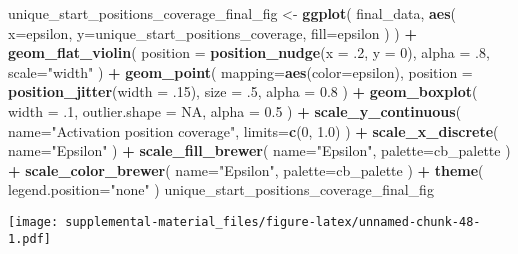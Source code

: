 \documentclass[]{book}
\newenvironment{Shaded}{\begin{snugshade}}{\end{snugshade}}
\newcommand{\DataTypeTok}[1]{\textcolor[rgb]{0.13,0.29,0.53}{#1}}
\newcommand{\DecValTok}[1]{\textcolor[rgb]{0.00,0.00,0.81}{#1}}
\newcommand{\FloatTok}[1]{\textcolor[rgb]{0.00,0.00,0.81}{#1}}
\newcommand{\KeywordTok}[1]{\textcolor[rgb]{0.13,0.29,0.53}{\textbf{#1}}}
\newcommand{\NormalTok}[1]{#1}
\newcommand{\OperatorTok}[1]{\textcolor[rgb]{0.81,0.36,0.00}{\textbf{#1}}}
\newcommand{\OtherTok}[1]{\textcolor[rgb]{0.56,0.35,0.01}{#1}}
\newcommand{\StringTok}[1]{\textcolor[rgb]{0.31,0.60,0.02}{#1}}
\begin{document}
\begin{Shaded}
\begin{Highlighting}[]
\NormalTok{unique_start_positions_coverage_final_fig <-}\StringTok{ }\KeywordTok{ggplot}\NormalTok{(}
\NormalTok{    final_data,}
    \KeywordTok{aes}\NormalTok{(}
      \DataTypeTok{x=}\NormalTok{epsilon,}
      \DataTypeTok{y=}\NormalTok{unique_start_positions_coverage,}
      \DataTypeTok{fill=}\NormalTok{epsilon}
\NormalTok{    )}
\NormalTok{  ) }\OperatorTok{+}
\StringTok{  }\KeywordTok{geom_flat_violin}\NormalTok{(}
    \DataTypeTok{position =} \KeywordTok{position_nudge}\NormalTok{(}\DataTypeTok{x =} \FloatTok{.2}\NormalTok{, }\DataTypeTok{y =} \DecValTok{0}\NormalTok{),}
    \DataTypeTok{alpha =} \FloatTok{.8}\NormalTok{,}
    \DataTypeTok{scale=}\StringTok{"width"}
\NormalTok{  ) }\OperatorTok{+}
\StringTok{  }\KeywordTok{geom_point}\NormalTok{(}
    \DataTypeTok{mapping=}\KeywordTok{aes}\NormalTok{(}\DataTypeTok{color=}\NormalTok{epsilon),}
    \DataTypeTok{position =} \KeywordTok{position_jitter}\NormalTok{(}\DataTypeTok{width =} \FloatTok{.15}\NormalTok{),}
    \DataTypeTok{size =} \FloatTok{.5}\NormalTok{,}
    \DataTypeTok{alpha =} \FloatTok{0.8}
\NormalTok{  ) }\OperatorTok{+}
\StringTok{  }\KeywordTok{geom_boxplot}\NormalTok{(}
    \DataTypeTok{width =} \FloatTok{.1}\NormalTok{,}
    \DataTypeTok{outlier.shape =} \OtherTok{NA}\NormalTok{,}
    \DataTypeTok{alpha =} \FloatTok{0.5}
\NormalTok{  ) }\OperatorTok{+}
\StringTok{  }\KeywordTok{scale_y_continuous}\NormalTok{(}
    \DataTypeTok{name=}\StringTok{"Activation position coverage"}\NormalTok{,}
    \DataTypeTok{limits=}\KeywordTok{c}\NormalTok{(}\DecValTok{0}\NormalTok{, }\FloatTok{1.0}\NormalTok{)}
\NormalTok{  ) }\OperatorTok{+}
\StringTok{  }\KeywordTok{scale_x_discrete}\NormalTok{(}
    \DataTypeTok{name=}\StringTok{"Epsilon"}
\NormalTok{  ) }\OperatorTok{+}
\StringTok{  }\KeywordTok{scale_fill_brewer}\NormalTok{(}
    \DataTypeTok{name=}\StringTok{"Epsilon"}\NormalTok{,}
    \DataTypeTok{palette=}\NormalTok{cb_palette}
\NormalTok{  ) }\OperatorTok{+}
\StringTok{  }\KeywordTok{scale_color_brewer}\NormalTok{(}
    \DataTypeTok{name=}\StringTok{"Epsilon"}\NormalTok{,}
    \DataTypeTok{palette=}\NormalTok{cb_palette}
\NormalTok{  ) }\OperatorTok{+}
\StringTok{  }\KeywordTok{theme}\NormalTok{(}
    \DataTypeTok{legend.position=}\StringTok{"none"}
\NormalTok{  )}
\NormalTok{unique_start_positions_coverage_final_fig}
\end{Highlighting}
\end{Shaded}

\texttt{[image: supplemental-material\_files/figure-latex/unnamed-chunk-48-1.pdf]}
\end{document}
